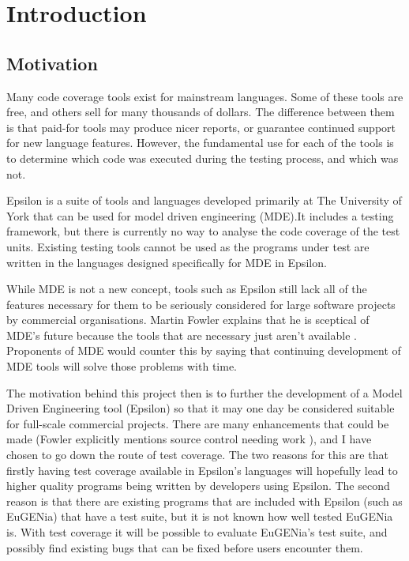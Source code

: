 \chapter{Introduction}

\section{Motivation}

Many code coverage tools exist for mainstream languages. Some of these tools are free, and others sell for many thousands of dollars. The difference between them is that paid-for tools may produce nicer reports, or guarantee continued support for new language features. However, the fundamental use for each of the tools is to determine which code was executed during the testing process, and which was not.

Epsilon is a suite of tools and languages developed primarily at The University of York that can be used for model driven engineering (MDE).It includes a testing framework, but there is currently no way to analyse the code coverage of the test units. Existing testing tools cannot be used as the programs under test are written in the languages designed specifically for MDE in Epsilon.

While MDE is not a new concept, tools such as Epsilon still lack all of the features necessary for them to be seriously considered for large software projects by commercial organisations. Martin Fowler explains that he is sceptical of MDE's future because the tools that are necessary just aren't available \cite{fowlerMDE}. Proponents of MDE would counter this by saying that continuing development of MDE tools will solve those problems with time.

The motivation behind this project then is to further the development of a Model Driven Engineering tool (Epsilon) so that it may one day be considered suitable for full-scale commercial projects. There are many enhancements that could be made (Fowler explicitly mentions source control needing work \cite{fowlerMDE}), and I have chosen to go down the route of test coverage. The two reasons for this are that firstly having test coverage available in Epsilon's languages will hopefully lead to higher quality programs being written by developers using Epsilon. The second reason is that there are existing programs that are included with Epsilon (such as EuGENia) that have a test suite, but it is not known how well tested EuGENia is. With test coverage it will be possible to evaluate EuGENia's test suite, and possibly find existing bugs that can be fixed before users encounter them.

